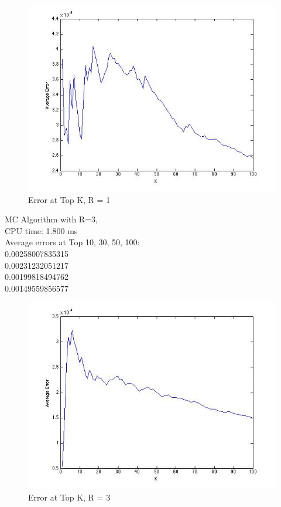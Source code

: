 \documentclass{article}
\begin{document}
\begin{figure}[H]
\centering
\includegraphics[scale=0.5]{q2-ErrorTopK-R1.jpg}
\caption{ Error at Top K, R = 1}
\label{}
\end{figure}

MC Algorithm with R=3, \\
\indent CPU time: 1.800 ms\\
\indent Average errors at Top 10, 30, 50, 100:\\
0.00258007835315 \\
0.00231232051217 \\
0.00199818494762 \\
0.00149559856577 \\

\begin{figure}[H]
\centering
\includegraphics[scale=0.5]{q2-ErrorTopK-R3.jpg}
\caption{ Error at Top K, R = 3}
\label{}
\end{figure}
\end{document}
